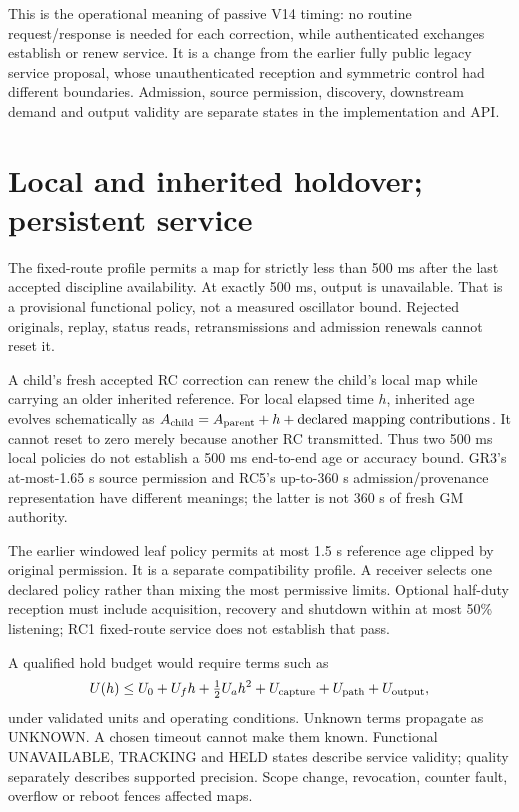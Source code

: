 \documentclass[11pt,letterpaper]{article}
\begin{document}
This is the operational meaning of passive V14 timing: no routine request/response is needed for each correction, while authenticated exchanges establish or renew service. It is a change from the earlier fully public legacy service proposal, whose unauthenticated reception and symmetric control had different boundaries. Admission, source permission, discovery, downstream demand and output validity are separate states in the implementation and API.

\section{Local and inherited holdover; persistent service}\label{sec:hold}
The fixed-route profile permits a map for strictly less than 500 ms after the last accepted discipline availability. At exactly 500 ms, output is unavailable. That is a provisional functional policy, not a measured oscillator bound. Rejected originals, replay, status reads, retransmissions and admission renewals cannot reset it.

A child's fresh accepted RC correction can renew the child's local map while carrying an older inherited reference. For local elapsed time $h$, inherited age evolves schematically as $A_{\rm child}=A_{\rm parent}+h+\text{declared mapping contributions}$. It cannot reset to zero merely because another RC transmitted. Thus two 500 ms local policies do not establish a 500 ms end-to-end age or accuracy bound. GR3's at-most-1.65 s source permission and RC5's up-to-360 s admission/provenance representation have different meanings; the latter is not 360 s of fresh GM authority.

The earlier windowed leaf policy permits at most 1.5 s reference age clipped by original permission. It is a separate compatibility profile. A receiver selects one declared policy rather than mixing the most permissive limits. Optional half-duty reception must include acquisition, recovery and shutdown within at most 50\% listening; RC1 fixed-route service does not establish that pass.

A qualified hold budget would require terms such as
\begin{equation}
 U(h)\le U_0+U_fh+\tfrac12 U_ah^2+U_{\rm capture}+U_{\rm path}+U_{\rm output},\label{eq:budget}
\end{equation}
under validated units and operating conditions. Unknown terms propagate as UNKNOWN. A chosen timeout cannot make them known. Functional UNAVAILABLE, TRACKING and HELD states describe service validity; quality separately describes supported precision. Scope change, revocation, counter fault, overflow or reboot fences affected maps.
\end{document}
